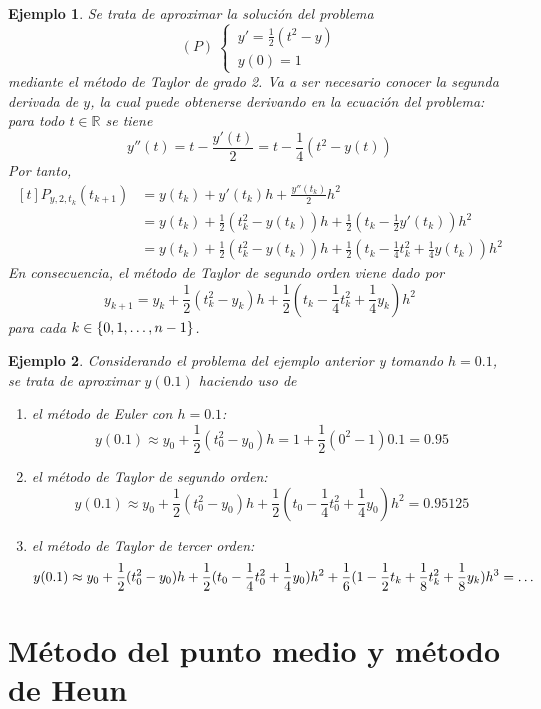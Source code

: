 \documentclass[11pt]{report}
\theoremstyle{mytheorem}
\theoremstyle{mydefinition}
\theoremstyle{myexample}
\newtheorem*{example}{Ejemplo}
\newcommand{\R}{\mathbb R}
\begin{document}
\begin{example}
Se trata de aproximar la solución del problema
\[(P) \ \begin{cases}
\, y' =\frac{1}{2}(t^2-y) \\
\,   y(0)=1\end{cases}\]
mediante el método de Taylor de grado 2. Va a ser necesario conocer la segunda derivada de $y$, la cual puede obtenerse derivando en la ecuación del problema: para todo $t \in \R$ se tiene
\[y''(t)=t-\frac{y'(t)}{2}=t-\frac{1}{4}(t^2-y(t))\]
Por tanto,
\[
\begin{aligned}[t]
P_{y,2,t_{k}}(t_{k+1})&=y(t_k)+y'(t_k)h+\frac{y''(t_k)}{2}h^2\\&=y(t_k)+\frac{1}{2}(t_k^2-y(t_k))h+\frac{1}{2}(t_k-\frac{1}{2}y'(t_k))h^2\\[5pt] 
&=y(t_k)+\frac{1}{2}(t_k^2-y(t_k))h+\frac{1}{2}(t_k-\frac{1}{4}t_k^2+\frac{1}{4}y(t_k))h^2
\end{aligned}\]
En consecuencia, el método de Taylor de segundo orden viene dado por
\[y_{k+1}= y_k+\frac{1}{2}(t_k^2-y_k)h+\frac{1}{2}(t_k-\frac{1}{4}t_k^2+\frac{1}{4}y_k)h^2\]
para cada $k \in \{0,1,\mathellipsis,n-1\}$. 
\end{example}

\begin{example}
Considerando el problema del ejemplo anterior y tomando $h=0.1$, se trata de aproximar $y(0.1)$ haciendo uso de
\begin{enumerate}
    \item el método de Euler con $h=0.1$:
    \[y(0.1)\approx y_0+\frac{1}{2}(t_0^2-y_0)h=1+\frac{1}{2}(0^2-1)0.1=0.95\]
    \item el método de Taylor de segundo orden:
    \[y(0.1)\approx y_0+\frac{1}{2}(t_0^2-y_0)h+\frac{1}{2}(t_0-\frac{1}{4}t_0^2+\frac{1}{4}y_0)h^2=0.95125\]
    \item el método de Taylor de tercer orden:
    \[y(0.1)\approx y_0+\frac{1}{2}(t_0^2-y_0)h+\frac{1}{2}(t_0-\frac{1}{4}t_0^2+\frac{1}{4}y_0)h^2+\frac{1}{6}(1-\frac{1}{2}t_k+\frac{1}{8}t_k^2+\frac{1}{8}y_k)h^3=\mathellipsis\]
\end{enumerate}
\end{example}

\section{Método del punto medio y método de Heun}
\end{document}
